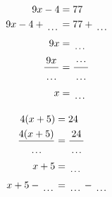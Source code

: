 \documentclass[12pt]{article}
\newcounter{minipagecount}
\begin{document}
\begin{multicols}{2}
\begin{minipage}[t]{0.45\textwidth}
    \raggedright %
    \begin{align*} %
        9x - 4 &= 77\\
        9x - 4 + \dotuline{\hspace{5mm}} &= 77 + \dotuline{\hspace{5mm}}\\
        9x &= \dotuline{\hspace{5mm}}\\
        \frac{9x}{\dotuline{\hspace{5mm}}} &= \frac{\dotuline{\hspace{5mm}}}{\dotuline{\hspace{5mm}}}\\
        x &= \dotuline{\hspace{5mm}}\\
    \end{align*}
\end{minipage} %
\noindent{(\theminipagecount)}\hspace{0.1mm} %
\begin{minipage}[t]{0.45\textwidth} %
    \vspace{-26pt}  %
    \raggedright %
    \begin{align*} %
        4(x + 5) &= 24\\
        \frac{4(x+5)}{\dotuline{\hspace{5mm}}} &= \frac{24}{\dotuline{\hspace{5mm}}}\\
        x + 5 &= \dotuline{\hspace{5mm}}\\
        x + 5 - \dotuline{\hspace{5mm}} &= \dotuline{\hspace{5mm}} - \dotuline{\hspace{5mm}}\\

\end{align*}
\end{minipage}
\end{multicols}
\end{document}
